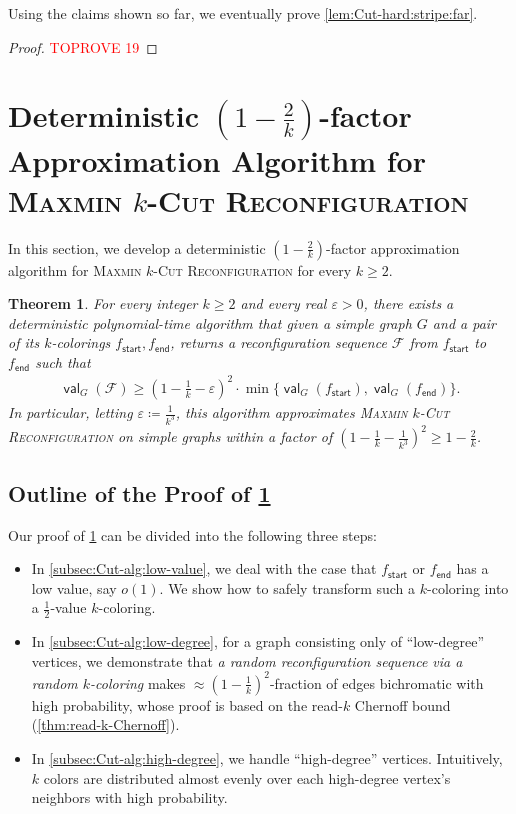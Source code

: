\documentclass[11pt,fleqn]{article}
\renewcommand{\geq}{\geqslant}
\renewcommand{\epsilon}{\varepsilon}
\newcommand{\prb}[1]{\textsc{#1}\xspace}
\newcommand{\defeq}{\coloneq}
\DeclareMathOperator{\val}{\mathsf{val}}
\newcommand{\sss}{\mathsf{start}}
\newcommand{\ttt}{\mathsf{end}}
\newcommand{\f}{f}
\newcommand{\sqcol}{\scrF}
\newcommand{\MMkCutReconf}{\prb{Maxmin $k$-Cut Reconfiguration}}
\newcommand{\scrF}{\mathscr{F}}
\newtheorem{theorem}{Theorem}[section]
\theoremstyle{definition}
\numberwithin{equation}{section}
\begin{document}
Using the claims shown so far, we eventually prove \cref{lem:Cut-hard:stripe:far}.


\begin{proof}\textcolor{red}{TOPROVE 19}\end{proof}
 \section{Deterministic $\left(1-\frac{2}{k}\right)$-factor Approximation Algorithm for \MMkCutReconf}
\label{sec:Cut-alg}


In this section, we develop
a deterministic $\left(1-\frac{2}{k}\right)$-factor approximation algorithm for 
\MMkCutReconf for every $k \geq 2$.


\begin{theorem}
\label{thm:Cut-alg}
For every integer $k \geq 2$ and every real $\epsilon > 0$,
there exists a deterministic polynomial-time algorithm that
given a simple graph $G$ and a pair of its $k$-colorings $\f_\sss,\f_\ttt$,
returns a reconfiguration sequence $\sqcol$ from $\f_\sss$ to $\f_\ttt$ such that
\begin{align}
    \val_G(\sqcol) \geq
    \left(1-\frac{1}{k}-\epsilon\right)^2
    \cdot \min\Big\{ \val_G(\f_\sss), \val_G(\f_\ttt) \Bigr\}.
\end{align}
In particular,
letting $\epsilon \defeq \frac{1}{k^3}$,
this algorithm approximates
\MMkCutReconf on simple graphs within a factor of
$\left(1-\frac{1}{k}-\frac{1}{k^3}\right)^2 \geq 1-\frac{2}{k}$.
\end{theorem}


\subsection{Outline of the Proof of \texorpdfstring{\cref{thm:Cut-alg}}{Theorem~\protect\ref{thm:Cut-alg}}}
Our proof of \cref{thm:Cut-alg} can be divided into the following three steps:
\begin{itemize}
    \item In \cref{subsec:Cut-alg:low-value},
        we deal with the case that 
        $\f_\sss$ or $\f_\ttt$ has a low value, say $o(1)$.
        We show how to safely transform such a $k$-coloring into a $\frac{1}{2}$-value $k$-coloring.

    \item In \cref{subsec:Cut-alg:low-degree},
        for a graph consisting only of ``low-degree'' vertices,
        we demonstrate that \emph{a random reconfiguration sequence via a random $k$-coloring}
        makes $\approx \left(1-\frac{1}{k}\right)^2$-fraction of edges bichromatic with high probability,
        whose proof is based on the read-$k$ Chernoff bound (\cref{thm:read-k-Chernoff}).

    \item In \cref{subsec:Cut-alg:high-degree},
        we handle ``high-degree'' vertices.
        Intuitively,
        $k$ colors are distributed almost evenly over
        each high-degree vertex's neighbors with high probability.
\end{itemize}
\end{document}
